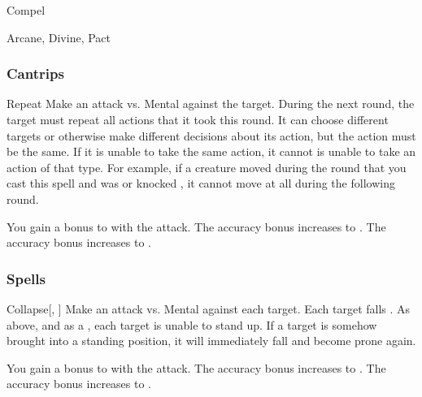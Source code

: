 \newpage
\begin{spellsection}{Compel}

\begin{spellheader}
\end{spellheader}


 Arcane, Divine, Pact

\subsubsection{Cantrips}


\begin{freeability}{Repeat}
Make an attack vs. Mental against the target.
\hit During the next round, the target must repeat all actions that it took this round.
It can choose different targets or otherwise make different decisions about its action, but the action must be the same.
If it is unable to take the same action, it cannot is unable to take an action of that type.
For example, if a creature moved during the round that you cast this spell and was  or knocked , it cannot move at all during the following round.

\rankline
{} You gain a  bonus to  with the attack.
 The accuracy bonus increases to .
 The accuracy bonus increases to .
\end{freeability}

\end{spellsection}


\subsubsection{Spells}


\lowercase{\hypertarget{spell:Collapse}{}}\label{spell:Collapse}
\begin{freeability}[Rank 1]{\hypertarget{spell:Collapse}{Collapse}}[, ]
Make an attack vs. Mental against each target.
\hit Each target falls .
\crit As above, and as a , each target is unable to stand up.
If a target is somehow brought into a standing position, it will immediately fall and become prone again.

\rankline
{} You gain a  bonus to  with the attack.
 The accuracy bonus increases to .
 The accuracy bonus increases to .
\end{freeability}
\vspace{0.25em}



